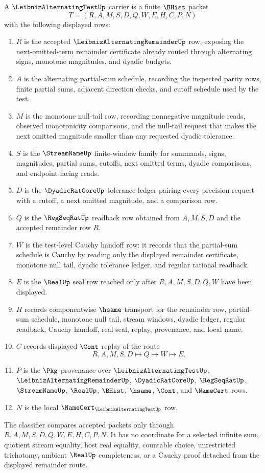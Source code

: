 \begin{definition}
\label{def:leibniz-alternating-test-carrier}
A $\LeibnizAlternatingTestUp$ carrier is a finite $\BHist$ packet
$$
T=(R,A,M,S,D,Q,W,E,H,C,P,N)
$$
with the following displayed rows:
\begin{enumerate}
\item $R$ is the accepted $\LeibnizAlternatingRemainderUp$ row, exposing the next-omitted-term remainder certificate already routed through alternating signs, monotone magnitudes, and dyadic budgets.
\item $A$ is the alternating partial-sum schedule, recording the inspected parity rows, finite partial sums, adjacent direction checks, and cutoff schedule used by the test.
\item $M$ is the monotone null-tail row, recording nonnegative magnitude reads, observed monotonicity comparisons, and the null-tail request that makes the next omitted magnitude smaller than any requested dyadic tolerance.
\item $S$ is the $\StreamNameUp$ finite-window family for summands, signs, magnitudes, partial sums, cutoffs, next omitted terms, dyadic comparisons, and endpoint-facing reads.
\item $D$ is the $\DyadicRatCoreUp$ tolerance ledger pairing every precision request with a cutoff, a next omitted magnitude, and a comparison row.
\item $Q$ is the $\RegSeqRatUp$ readback row obtained from $A,M,S,D$ and the accepted remainder row $R$.
\item $W$ is the test-level Cauchy handoff row: it records that the partial-sum schedule is Cauchy by reading only the displayed remainder certificate, monotone null tail, dyadic tolerance ledger, and regular rational readback.
\item $E$ is the $\RealUp$ seal row reached only after $R,A,M,S,D,Q,W$ have been displayed.
\item $H$ records componentwise $\hsame$ transport for the remainder row, partial-sum schedule, monotone null tail, stream windows, dyadic ledger, regular readback, Cauchy handoff, real seal, replay, provenance, and local name.
\item $C$ records displayed $\Cont$ replay of the route
$$
R,A,M,S,D \longmapsto Q \longmapsto W \longmapsto E .
$$
\item $P$ is the $\Pkg$ provenance over $\LeibnizAlternatingTestUp$, $\LeibnizAlternatingRemainderUp$, $\DyadicRatCoreUp$, $\RegSeqRatUp$, $\StreamNameUp$, $\RealUp$, $\BHist$, $\hsame$, $\Cont$, and $\NameCert$ rows.
\item $N$ is the local $\NameCert_{\LeibnizAlternatingTestUp}$ row.
\end{enumerate}
The classifier compares accepted packets only through $R,A,M,S,D,Q,W,E,H,C,P,N$. It has no coordinate for a selected infinite sum, quotient stream equality, host real equality, countable choice, unrestricted trichotomy, ambient $\RealUp$ completeness, or a Cauchy proof detached from the displayed remainder route.
\end{definition}

